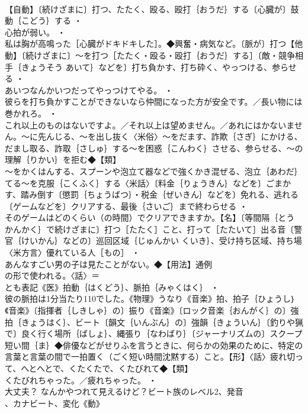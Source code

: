 \documentclass[8pt]{extreport}
\begin{document}
\begin{CJK}{UTF8}{min}
\\	【自動】〔続けざまに〕打つ、たたく、殴る、殴打｛おうだ｝する〔心臓が〕鼓動｛こどう｝する ・
\\	心拍が弱い。 ・
\\	私は胸が高鳴った［心臓がドキドキした］。◆興奮・病気など。〔脈が〕打つ【他動】〔続けざまに〕～を打つ［たたく・殴る・殴打｛おうだ｝する］〔敵・競争相手｛きょうそう あいて｝などを〕打ち負かす、打ち砕く、やっつける、参らせる ・
\\	あいつなんかいつだってやっつけてやる。 ・
\\	彼らを打ち負かすことができないなら仲間になった方が安全です。／長い物には巻かれろ。 ・
\\	これ以上のものはないですよ。／それ以上は望めません。／あれにはかないません。～に先んじる、～を出し抜く〈米俗〉～をだます、詐欺｛さぎ｝にかける、だまし取る、詐取｛さしゅ｝する～を困惑｛こんわく｝させる、参らせる、～の理解｛りかい｝を拒む◆【類】
\\	～をかくはんする、スプーンや泡立て器などで強くかき混ぜる、泡立｛あわだ｝てる～を克服｛こくふく｝する〈米話〉〔料金｛りょうきん｝などを〕ごまかす、踏み倒す〔懲罰｛ちょうばつ｝・税金｛ぜいきん｝などを〕免れる、逃れる〔ゲームなどを〕クリアする、最後｛さいご｝まで終わらせる ・
\\	そのゲームはどのくらい（の時間）でクリアできますか。【名】〔等間隔｛とう かんかく｝で続けざまに〕打つ［たたく］こと、打って［たたいて］出る音〔警官｛けいかん｝などの〕巡回区域｛じゅんかい くいき｝、受け持ち区域、持ち場〈米方言〉優れている人［もの］ ・
\\	あんなすごい男の子は見たことがない。◆【用法】通例
\\	の形で使われる。〈話〉＝
\\	とも表記《医》拍動｛はくどう｝、脈拍｛みゃくはく｝ ・
\\	彼の脈拍は1分当たり110でした。《物理》うなり《音楽》拍、拍子｛ひょうし｝《音楽》〔指揮者｛しきしゃ｝の〕振り《音楽》〔ロック音楽｛おんがく｝の〕強拍｛きょうはく｝、ビート〔韻文｛いんぶん｝の〕強韻｛きょういん｝〔釣りや猟で〕良く行く場所｛ばしょ｝、縄張り｛なわばり｝〔ジャーナリズムの〕スクープ短い間｛ま｝◆俳優などがせりふを言うときに、何らかの効果のために、特定の言葉と言葉の間で一拍置く（ごく短い時間沈黙する）こと。【形】〈話〉疲れ切って、へとへとで、くたくたで、くたびれて◆【類】
\\	くたびれちゃった。／疲れちゃった。 ・
\\	大丈夫？ なんかやつれて見えるけど？ビート族のレベル2、発音
\\	、カナビート、変化《動》

\end{CJK}
\end{document}
